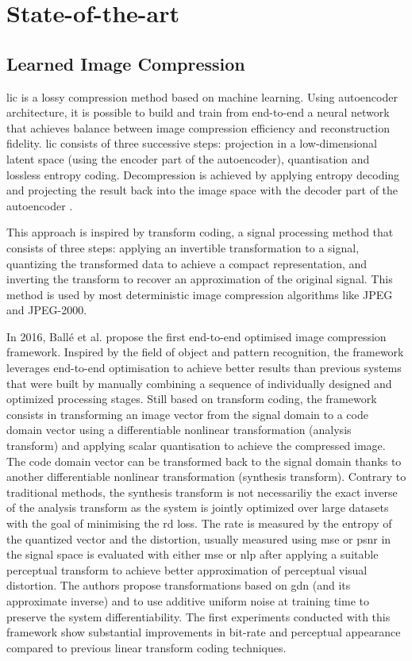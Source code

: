 \chapter{State-of-the-art}
\label{sota}

\section{Learned Image Compression}
\acrfull{lic} is a lossy compression method based on machine learning. Using autoencoder architecture, it is possible to build and train from end-to-end a neural network that achieves balance between image compression efficiency and reconstruction fidelity. \acrshort{lic} consists of three successive steps: projection in a low-dimensional latent space (using the encoder part of the autoencoder), quantisation and lossless entropy coding. Decompression is achieved by applying entropy decoding and projecting the result back into the image space with the decoder part of the autoencoder \cite{licmedium, licstanford}.

This approach is inspired by transform coding, a signal processing method that consists of three steps: applying an invertible transformation to a signal, quantizing the transformed data to achieve a compact representation, and inverting the transform to recover an approximation of the original signal. This method is used by most deterministic image compression algorithms like JPEG and JPEG-2000.

In 2016, Ballé et al. \cite{ballé2016endtoendoptimizationnonlineartransform} propose the first end-to-end optimised image compression framework. Inspired by the field of object and pattern recognition, the framework leverages end-to-end optimisation to achieve better results than previous systems that were built by manually combining a sequence of individually designed and optimized processing stages. Still based on transform coding, the framework consists in transforming an image vector from the signal domain to a code domain vector using a differentiable nonlinear transformation (analysis transform) and applying scalar quantisation to achieve the compressed image. The code domain vector can be transformed back to the signal domain thanks to another differentiable nonlinear transformation (synthesis transform). Contrary to traditional methods, the synthesis transform is not necessariliy the exact inverse of the analysis transform as the system is jointly optimized over large datasets with the goal of minimising the \acrfull{rd} loss. The rate is measured by the entropy of the quantized vector and the distortion, usually measured using \acrshort{mse} or \acrshort{psnr} in the signal space is evaluated with either \acrshort{mse} or \acrfull{nlp} after applying a suitable perceptual transform to achieve better approximation of perceptual visual distortion. The authors propose transformations based on \acrfull{gdn} (and its approximate inverse) and to use additive uniform noise at training time to preserve the system differentiability. The first experiments conducted with this framework show substantial improvements in bit-rate and perceptual appearance compared to previous linear transform coding techniques.

